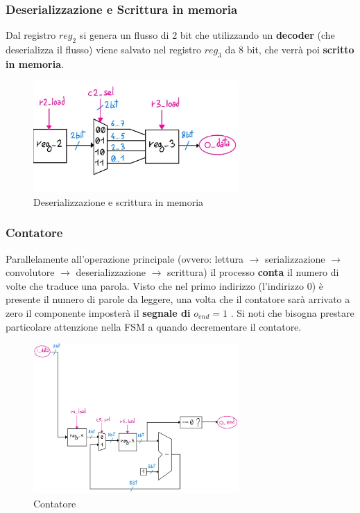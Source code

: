 \documentclass[12pt]{article} %
\begin{document}
			\subsubsection{Deserializzazione e Scrittura in memoria}
				Dal registro $reg_2$ si genera un flusso di 2 bit che utilizzando un \textbf{decoder} 
				(che deserializza il flusso) viene salvato nel registro $reg_3$ da 8 bit, 
				che verrà poi \textbf{scritto in memoria}.
				\begin{figure}[h]
					\centering
					\includegraphics[width=0.7\textwidth]{Data_path_scritturaMemoria.jpg}
					\caption{Deserializzazione e scrittura in memoria}
					\label{fig:Data_path_scritturaMemoria}
				\end{figure}
			\subsubsection{Contatore}
				Parallelamente all'operazione principale (ovvero: lettura $\rightarrow$ serializzazione
				$\rightarrow$ convolutore $\rightarrow$ deserializzazione $\rightarrow$ scrittura)
				il processo \textbf{conta} il numero di volte che traduce una parola. 
				Visto che nel primo indirizzo (l'indirizzo 0) è presente il numero di parole da leggere, 
				una volta che il contatore sarà arrivato a zero il componente imposterà
				il \textbf{segnale di} $o_{end} = 1$ . 
				Si noti che bisogna prestare particolare attenzione nella FSM 
				a quando decrementare il contatore.
				\begin{figure}[h]
					\centering
					\includegraphics[width=0.7\textwidth]{Data_path_contatore.jpg}
					\caption{Contatore}
					\label{fig:Data_path_contatore}
				\end{figure}
\end{document}
